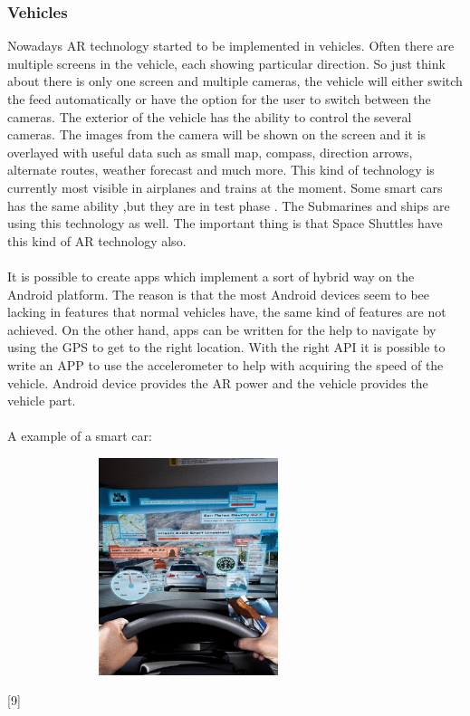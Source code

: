  \subsubsection{Vehicles}
 Nowadays AR technology started to be implemented in vehicles. Often there are multiple screens in the vehicle, each showing particular direction. So just think about there is only one screen and multiple cameras, the vehicle will either switch the feed automatically or have the option for the user to switch  between the cameras. The exterior of the vehicle has the ability to control the several cameras. The images from the camera will be shown on the screen and it is overlayed with useful data such as small map, compass, direction arrows, alternate routes, weather forecast and much more. This kind of technology is currently most visible in airplanes and trains at the moment. Some smart cars has the same ability ,but they are in test phase . The Submarines and ships are using this technology as well. The important thing is that Space Shuttles have this kind of AR technology also.
 \\
 \\
 It is possible to create apps which implement a sort of hybrid way on the Android platform. The reason is that the most Android devices seem to bee lacking in features that normal vehicles have, the same kind of features are not achieved. On the other hand, apps can be written for the help to navigate by using the GPS to get to the right location.  With the right API it is possible to write an APP to use the accelerometer to help with  acquiring the speed of the vehicle. Android device provides the AR power and the vehicle  provides the vehicle part.\cite{AugmentedBook}
 \\
 \\
 A example of a smart car:
 \begin{figure}[htbp]
 \centering
 \includegraphics[width=240pt,height=180pt,keepaspectratio]{graphics/smartcar.PNG}
 \caption{\cite{smartcar}}
 \end{figure}
 [9]
